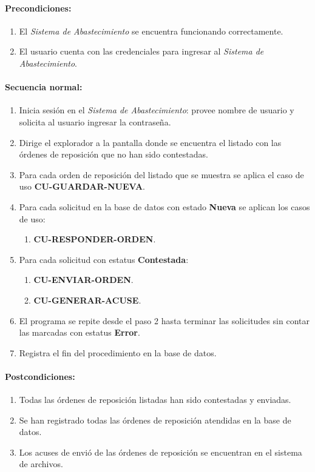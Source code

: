 \paragraph{Precondiciones:}
\begin{enumerate}
  \item El \textit{Sistema de Abastecimiento} se encuentra funcionando correctamente.
  \item El usuario cuenta con las credenciales para ingresar al \textit{Sistema de Abastecimiento}.
\end{enumerate}
\paragraph{Secuencia normal:}
\begin{enumerate}
  \item Inicia sesión en el \textit{Sistema de Abastecimiento}: provee nombre de usuario y solicita al usuario ingresar la contraseña.
  \item Dirige el explorador a la pantalla donde se encuentra el listado con las órdenes de reposición que no han sido contestadas.
  \item Para cada orden de reposición del listado que se muestra se aplica el caso de uso \textbf{CU-GUARDAR-NUEVA}.
  \item Para cada solicitud en la base de datos con estado \textbf{Nueva} se aplican los casos de uso:
  \begin{enumerate}
    \item \textbf{CU-RESPONDER-ORDEN}.
  \end{enumerate}
  \item Para cada solicitud con estatus \textbf{Contestada}:
  \begin{enumerate}
    \item \textbf{CU-ENVIAR-ORDEN}.
    \item \textbf{CU-GENERAR-ACUSE}.
  \end{enumerate}
  \item El programa se repite desde el paso 2 hasta terminar las solicitudes sin contar las marcadas con estatus \textbf{Error}.
  \item Registra el fin del procedimiento en la base de datos.
\end{enumerate}
\paragraph{Postcondiciones:}
\begin{enumerate}
  \item Todas las órdenes de reposición listadas han sido contestadas y enviadas.
  \item Se han registrado todas las órdenes de reposición atendidas en la base de datos.
  \item Los acuses de envió de las órdenes de reposición se encuentran en el sistema de archivos.
\end{enumerate}
